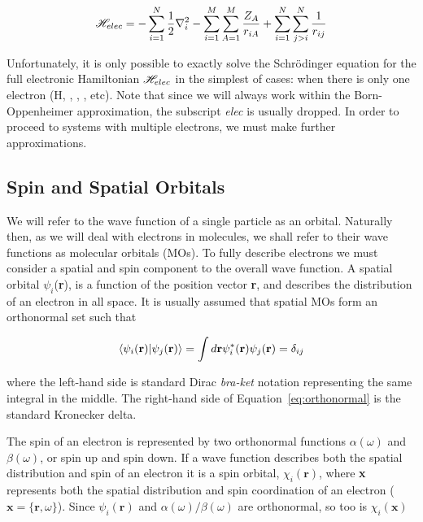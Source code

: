 \begin{equation}
  \mathscr{H}_{elec} = -\sum_{i=1}^N \frac{1}{2}\nabla_i^2  -\sum_{i=1}^M\sum_{A=1}^M\frac{Z_A}{r_{iA}}
  + \sum_{i=1}^N\sum_{j>i}^N \frac{1}{r_{ij}}
\label{eq:hamelect}
\end{equation}

\noindent Unfortunately, it is only possible to exactly solve the
Schr{\"o}dinger equation for the full electronic Hamiltonian $\mathscr{H}_{elec}$ in
the simplest of cases: when there is only one electron (H, ,
, , etc). Note that since we will always work within the
Born-Oppenheimer approximation, the subscript \emph{elec} is usually dropped.
In order to proceed to systems with multiple electrons, we must make further
approximations.

\subsection{Spin and Spatial Orbitals}

We will refer to the wave function of a single particle as an orbital.
Naturally then, as we will deal with electrons in molecules, we shall refer to
their wave functions as molecular orbitals (MOs). To fully describe electrons
we must consider a spatial and spin component to the overall wave function. A
spatial orbital $\psi_i$(\textbf{r}), is a function of the position vector
\textbf{r}, and describes the distribution of an electron in all space. It is
usually assumed that spatial MOs form an orthonormal set such that

\begin{equation}
\bra{\psi_i(\mathbf{r})}\ket{\psi_j(\mathbf{r})} =
\int d\mathbf{r} \psi_i^*(\mathbf{r})\psi_j(\mathbf{r}) = \delta_{ij}
\label{eq:orthonormal}
\end{equation}

\noindent where the left-hand side is standard Dirac \emph{bra-ket} notation
representing the same integral in the middle. The right-hand side of
Equation~\ref{eq:orthonormal} is the standard Kronecker delta.

The spin of an electron is represented by two orthonormal functions
$\alpha(\omega)$ and $\beta(\omega)$, or spin up and spin down. If a wave
function describes both the spatial distribution and spin of an electron it is
a spin orbital, $\chi_i(\mathbf{r})$, where \textbf{x} represents both the
spatial distribution and spin coordination of an electron ($\mathbf{x} = \{
\mathbf{r}, \omega \}$). Since $\psi_i(\mathbf{r})$ and
$\alpha(\omega)/\beta(\omega)$ are orthonormal, so too is $\chi_i(\mathbf{x})$

